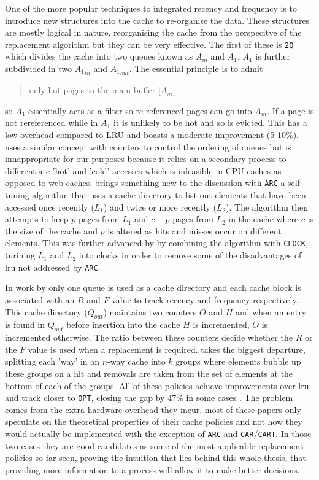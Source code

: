 One of the more popular techniques to integrated recency and frequency is to introduce new structures into the cache to re-organise the data. These structures are mostly logical in nature, reorganising the cache from the perspecitve of the replacement algorithm but they can be very effective. The first of these is \texttt{2Q} \cite{johnson2QLowOverhead1994} which divides the cache into two queues known as $A_m$ and $A_1$. $A_1$ is further subdivided in two ${A_1}_{in}$ and ${A_1}_{out}$. The essential principle is to admit \blockcquote{johnson2QLowOverhead1994}{only hot pages to the main buffer [$A_m$]} so $A_1$ essentially acts as a filter so re-referenced pages can go into $A_m$. If a page is not rereferenced while in $A_1$ it is unlikely to be hot and so is evicted. This has a low overhead compared to LRU and boasts a moderate improvement (5-10\%). \citet{menaudImprovingEffectivenessWeb2000} uses a similar concept with counters to control the ordering of queues but is innappropriate for our purposes because it relies on a secondary process to differentiate 'hot' and 'cold' accesses which is infeasible in CPU caches as opposed to web caches.  \citet{megiddoARCSelfTuningLow2003} brings something new to the discussion with \texttt{ARC} a self-tuning algorithm that uses a cache directory to list out elements that have been accessed once recently ($L_1$) and twice or more recently ($L_2$). The algorithm then attempts to keep $p$ pages from $L_1$ and $c-p$ pages from $L_2$ in the cache where $c$ is the size of the cache and $p$ is altered as hits and misses occur on different elements. This was further advanced by \citet{bansalCARClockAdaptive2004} by combining the algorithm with \texttt{CLOCK}, turining $L_1$ and $L_2$ into clocks in order to remove some of the disadvantages of \gls{lru} not addressed by \texttt{ARC}. 

In work by \citet{liCRFPNovelAdaptive2008} only one queue is used as a cache directory and each cache block is associated with an $R$ and $F$ value to track recency and frequency respectively. This cache directory ($Q_{out}$) maintains two counters $O$ and $H$ and when an entry is found in $Q_{out}$ before insertion into the cache $H$ is incremented, $O$ is incremented otherwise. The ratio between these counters decide whether the $R$ or the $F$ value is used when a replacement is required. \citet{zhangDivideandconquerBubbleReplacement2009} takes the biggest departure, splitting each 'way' in an $n$-way cache into $k$ groups where elements bubble up these groups on a hit and removals are taken from the set of elements at the bottom of each of the groups. All of these policies achieve improvements over \gls{lru} and track closer to \texttt{OPT}, closing the gap by 47\% in some cases \cite{zhangDivideandconquerBubbleReplacement2009}. The problem comes from the extra hardware overhead they incur, most of these papers only speculate on the theoretical properties of their cache policies and not how they would actually be implemented with the exception of \texttt{ARC} and \texttt{CAR}/\texttt{CART}. In those two cases they are good candidates as some of the most applicable replacement policies so far seen, proving the intuition that lies behind this whole thesis, that providing more information to a process will allow it to make better decisions.

